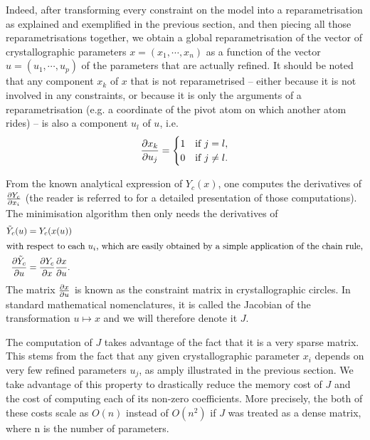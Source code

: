\documentclass[pdf]{iucr}
\begin{document}
Indeed, after transforming every constraint on the model into a reparametrisation as explained and exemplified in the previous section, and then piecing all those reparametrisations together, we obtain a global reparametrisation of the vector of crystallographic parameters $x = (x_1, \cdots, x_n)$ as a function of the vector $u=(u_1, \cdots, u_p)$ of the parameters that are actually refined. It should be noted that any component $x_k$ of $x$ that is not reparametrised -- either because it is not involved in any constraints, or because it is only the arguments of a reparametrisation (e.g. a coordinate of the pivot atom on which another atom rides) --  is also a component $u_l$ of $u$, i.e. 
\begin{equation}
\frac{\partial x_k}{\partial u_j} = \begin{cases} 
   1& \text{if $j=l$},\\
   0& \text{if $j \neq l$}.
   \end{cases}
\end{equation}

 From the known analytical expression of $Y_c(x)$, one computes the derivatives of $\frac{\partial Y_c}{\partial x_i}$ (the reader is referred to  for a detailed presentation of those computations). The minimisation algorithm then only needs the derivatives of
\begin{align}
\tilde{Y}_c(u) &= Y_c(x(u)) \\
 \intertext{with respect to each $u_i$, which are easily obtained by a simple application of the chain rule,}
\frac{\partial \tilde{Y}_c}{\partial u} &= \frac{\partial Y_c}{\partial x} \frac{\partial x}{\partial u}.
\end{align}
The matrix $\frac{\partial x}{\partial u}$ is known as the constraint matrix in crystallographic circles. In standard mathematical nomenclatures, it is called the Jacobian of the transformation $u \mapsto x$ and we will therefore denote it $J$.

The computation of $J$ takes advantage of the fact that it is a very sparse matrix. This stems from the fact that any given crystallographic parameter $x_i$ depends on very few refined parameters $u_j$, as amply illustrated in the previous section. We take advantage of this property to drastically reduce the memory cost of $J$ and the cost of computing each of its non-zero coefficients. More precisely, the both of these costs scale as $O(n)$ instead of $O(n^2)$ if $J$ was treated as a dense matrix, where n is the number of parameters.
\end{document}
